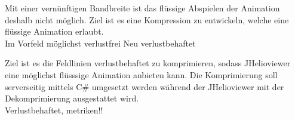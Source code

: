 Mit einer vernünftigen Bandbreite ist das flüssige Abspielen der Animation deshalb nicht möglich. Ziel ist es eine Kompression zu entwickeln, welche eine flüssige Animation erlaubt.\\[\baselineskip]
Im Vorfeld möglichst verlustfrei
Neu verlustbehaftet

Ziel ist es die Feldlinien verlustbehaftet zu komprimieren, sodass JHelioviewer eine möglichst flüsssige Animation anbieten kann. Die Komprimierung soll serverseitig mittels C\# umgesetzt werden während der JHelioviewer mit der Dekomprimierung ausgestattet wird.\\[\baselineskip] 
Verlustbehaftet, metriken!!

 